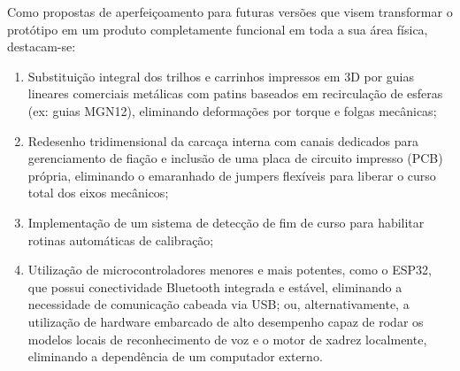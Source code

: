 \documentclass[11pt,a4paper]{article}
\begin{document}
Como propostas de aperfeiçoamento para futuras versões que visem transformar o protótipo em um produto completamente funcional em toda a sua área física, destacam-se:
\begin{enumerate}
    \item Substituição integral dos trilhos e carrinhos impressos em 3D por guias lineares comerciais metálicas com patins baseados em recirculação de esferas (ex: guias MGN12), eliminando deformações por torque e folgas mecânicas;
    \item Redesenho tridimensional da carcaça interna com canais dedicados para gerenciamento de fiação e inclusão de uma placa de circuito impresso (PCB) própria, eliminando o emaranhado de jumpers flexíveis para liberar o curso total dos eixos mecânicos;
    \item Implementação de um sistema de detecção de fim de curso para habilitar rotinas automáticas de calibração;
    \item Utilização de microcontroladores menores e mais potentes, como o ESP32, que possui conectividade Bluetooth integrada e estável, eliminando a necessidade de comunicação cabeada via USB; ou, alternativamente, a utilização de hardware embarcado de alto desempenho capaz de rodar os modelos locais de reconhecimento de voz e o motor de xadrez localmente, eliminando a dependência de um computador externo.
\end{enumerate}
\end{document}
